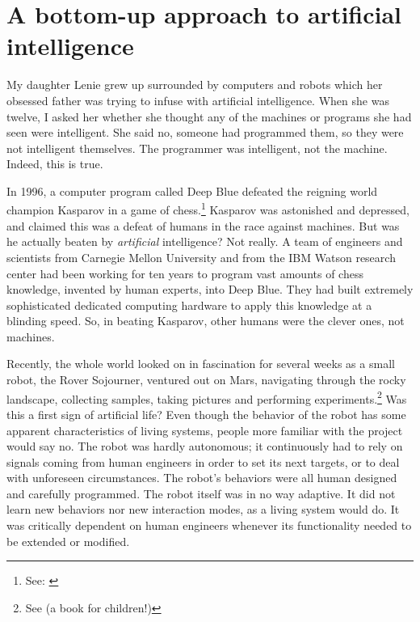 \section{A bottom-up approach to artificial intelligence}

 My daughter Lenie grew up surrounded by computers and 
robots which her obsessed father was trying to infuse
with artificial intelligence. When she was twelve, I asked
her whether she thought any of the machines or 
programs she had seen were intelligent. 
She said no, someone had programmed them, so they were
not intelligent themselves. The programmer was 
intelligent, not the machine. Indeed, this is true. 

In 1996, a computer program called Deep Blue
defeated the reigning world champion Kasparov in a game of 
chess.\footnote{See: \cite{Newborn:1996}}
Kasparov was astonished
and depressed, and claimed this was a defeat of humans in 
the 
race against machines. But was he actually beaten by {\itshape artificial}
intelligence? Not really. A team of engineers and scientists
from Carnegie Mellon University and from the IBM Watson 
research center had been working for ten years to program 
vast amounts of chess knowledge, invented by
human experts, into Deep Blue. They had built extremely 
sophisticated dedicated computing hardware to
apply this knowledge at a blinding speed. So, in beating Kasparov, 
other humans were the clever ones, not machines. 

Recently, the whole world looked on in fascination
for several weeks as a small robot, the Rover Sojourner, ventured
out on Mars, navigating through the rocky landscape, collecting
samples, taking pictures and performing 
experiments.\footnote{
See \cite{Wunsch:1998} (a book for children!)}
Was this a first sign of artificial life? Even though the 
behavior of the robot has some apparent characteristics
of living systems, people more
familiar with the project would say no. 
The robot was hardly autonomous; it continuously had to rely
on signals coming from human engineers in order to set
its next targets, or to deal with unforeseen circumstances. 
The robot's behaviors were
all human designed and carefully programmed. The robot 
itself was in no way adaptive. It did not learn new behaviors
nor new interaction modes, as a living system would do.
It was critically dependent on human engineers whenever its
functionality needed to be extended or modified. 

